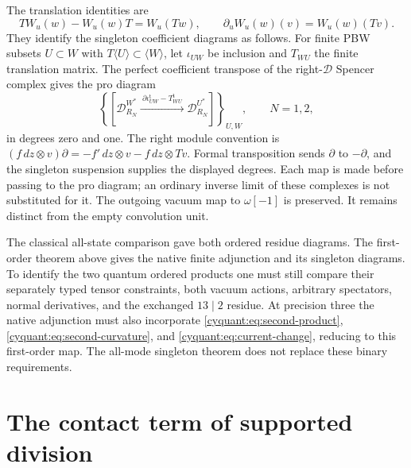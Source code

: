 The translation identities are
\[
 TW_u(w)-W_u(w)T=W_u(Tw),\qquad
 \partial_uW_u(w)(v)=W_u(w)(Tv).
\]
They identify the singleton coefficient diagrams as follows.
For finite PBW subsets $U\subset W$ with
$T\langle U\rangle\subset\langle W\rangle$, let $\iota_{UW}$ be
inclusion and $T_{WU}$ the finite translation matrix.  The perfect
coefficient transpose of the right-$\mathcal D$ Spencer complex gives
the pro diagram
\begin{equation}\label{cyquant:eq:ghost-spencer}
 \left\{
 \left[\mathcal D_{R_N}^{W^*}
       \xrightarrow{\ \partial\iota_{UW}^{\mathrm t}-T_{WU}^{\mathrm t}\ }
       \mathcal D_{R_N}^{U^*}\right]
 \right\}_{U,W},\qquad N=1,2,
\end{equation}
in degrees zero and one.  The right module convention is
$(f\,dz\otimes v)\partial=-f'\,dz\otimes v-f\,dz\otimes Tv$.
Formal transposition sends $\partial$ to $-\partial$, and the
singleton suspension supplies the displayed degrees.  Each map is
made before passing to the pro diagram; an ordinary inverse limit
of these complexes is not substituted for it.  The outgoing vacuum
map to $\omega[-1]$ is preserved.  It remains distinct from the
empty convolution unit.

The classical all-state comparison gave both ordered residue diagrams.
The first-order theorem above gives the native finite adjunction and
its singleton diagrams.  To identify the two quantum ordered products
one must still compare their separately typed tensor constraints,
both vacuum actions, arbitrary spectators, normal derivatives, and
the exchanged $13\mid2$ residue.  At precision three the native
adjunction must also incorporate \eqref{cyquant:eq:second-product},
\eqref{cyquant:eq:second-curvature}, and
\eqref{cyquant:eq:current-change}, reducing to this first-order map.
The all-mode singleton theorem does not replace these binary
requirements.

\section{The contact term of supported division}
\label{cyquant:sec:supported}

